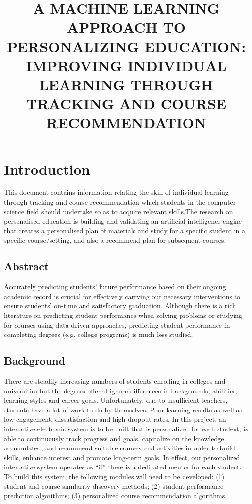\documentclass{article}
\begin{document}
\title{A MACHINE LEARNING APPROACH TO PERSONALIZING EDUCATION: IMPROVING INDIVIDUAL LEARNING THROUGH TRACKING AND COURSE RECOMMENDATION}

\maketitle

\section{Introduction}
This document contains information relating the skill of individual learning through tracking and course recommendation which students in the computer science field should undertake so as to acquire relevant skills.The research on personalised education is building and validating an artificial intelligence engine that creates a personalised plan of materials and study for a specific student in a specific course/setting, and also a recommend plan for subsequent courses.
\subsection{Abstract}
Accurately predicting students’ future performance based on their ongoing academic record is crucial for effectively carrying out necessary interventions to ensure students’
on-time and satisfactory graduation. \cite{key:1}Although there is a rich literature on predicting student performance when solving problems or studying for courses using data-driven approaches,
predicting student performance in completing degrees (e.g. college programs) is much less studied.

\subsection{Background}
There are steadily increasing numbers of students enrolling in colleges and universities but the degrees offered ignore differences in backgrounds, abilities, learning styles and career goals. Unfortunately, due to insufficient teachers, students have a lot of work to  do by themselves. Poor learning results as well as low engagement, dissatisfaction and high dropout rates. In this project, an interactive electronic system is to be built that is personalized for each student, is able to continuously track progress and goals, capitalize on the knowledge accumulated, and recommend suitable courses and activities in order to build skills, enhance interest and promote  long-term goals. In effect, our personalized interactive system operates as “if” there is a dedicated mentor for each student. To build this system, the following modules will need to be developed: (1) student and course similarity discovery methods; (2) student performance prediction algorithms; (3) personalized course recommendation algorithms.
\end{document}
